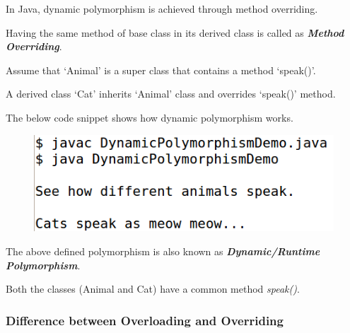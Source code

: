 \documentclass[11pt,a4paper]{article}
\begin{document}
 In Java, dynamic polymorphism is achieved through method overriding.
 
 Having the same method of base class in its derived class is called as \emph{\textbf{Method Overriding}}.

 Assume that `Animal' is a super class that contains a method `speak()'.

 A derived class `Cat' inherits `Animal' class and overrides `speak()' method.

The below code snippet shows how dynamic polymorphism works.

%
%

  \begin{figure}[H] 
 \begin{center}
   \includegraphics[scale=.5]{DynamicPolymorphismDemo.png}
 \end{center}
 \end{figure}

 The above defined polymorphism is also known as \emph{\textbf{Dynamic/Runtime Polymorphism}}.

 Both the classes (Animal and Cat) have a common method \emph{speak()}.
\vfill{\ }
\subsubsection*{Difference between Overloading and Overriding}
\end{document}
